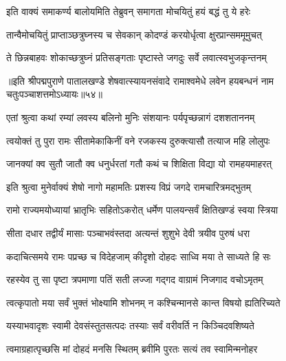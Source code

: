 
\twolineshloka
{इति वाक्यं समाकर्ण्य बालोयमिति तेब्रुवन्}
{समागता मोचयितुं हयं बद्धं तु ये हरेः}%

\twolineshloka
{तान्वैमोचयितुं प्राप्ताञ्छत्रुघ्नस्य च सेवकान्}
{कोदण्डं करयोर्धृत्वा क्षुरप्रान्सममूमुचत्}%

\twolineshloka
{ते छिन्नबाहवः शोकाच्छत्रुघ्नं प्रतिसङ्गताः}
{पृष्टास्ते जगदुः सर्वे लवात्स्वभुजकृन्तनम्}%

॥इति श्रीपद्मपुराणे पातालखण्डे शेषवात्स्यायनसंवादे रामाश्वमेधे लवेन हयबन्धनं नाम चतुःपञ्चाशत्तमोऽध्यायः॥५४॥



\twolineshloka
{एतां श्रुत्वा कथां रम्यां लवस्य बलिनो मुनिः}
{संशयानः पर्यपृच्छन्नागं दशशताननम्}%


\twolineshloka
{त्वयोक्तं तु पुरा रामः सीतामेकाकिनीं वने}
{रजकस्य दुरुक्त्यासौ तत्याज महि लोलुपः}%

\twolineshloka
{जानक्यां क्व सुतौ जातौ क्व धनुर्धरतां गतौ}
{कथं च शिक्षिता विद्या यो रामहयमाहरत्}%


\twolineshloka
{इति श्रुत्वा मुनेर्वाक्यं शेषो नागो महामतिः}
{प्रशस्य विप्रं जगदे रामचारित्रमद्भुतम्}%


\twolineshloka
{रामो राज्यमयोध्यायां भ्रातृभिः सहितोऽकरोत्}
{धर्मेण पालयन्सर्वं क्षितिखण्डं स्वया स्त्रिया}%

\twolineshloka
{सीता दधार तद्वीर्यं मासाः पञ्चाभवंस्तदा}
{अत्यन्तं शुशुभे देवी त्रयीव पुरुषं धरा}%

\twolineshloka
{कदाचित्समये रामः पप्रच्छ च विदेहजाम्}
{कीदृशो दोहदः साध्वि मया ते साध्यते हि सः}%

\twolineshloka
{रहस्येव तु सा पृष्टा त्रपमाणा पतिं सती}
{लज्जा गद्गद वाग्रामं निजगाद वचोऽमृतम्}%


\twolineshloka
{त्वत्कृपातो मया सर्वं भुक्तं भोक्ष्यामि शोभनम्}
{न कश्चिन्मानसे कान्त विषयो ह्यतिरिच्यते}%

\twolineshloka
{यस्याभवादृशः स्वामी देवसंस्तुतसत्पदः}
{तस्याः सर्वं वरीवर्ति न किञ्चिदवशिष्यते}%

\twolineshloka
{त्वमाग्रहात्पृच्छसि मां दोहदं मनसि स्थितम्}
{ब्रवीमि पुरतः सत्यं तव स्वामिन्मनोहर}%

